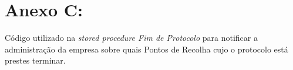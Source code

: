 \chapter{Anexo C: }
\label{anexo:C}
Código utilizado na \textit{stored procedure Fim de Protocolo} para notificar a administração da empresa sobre quais Pontos de Recolha cujo o protocolo está prestes terminar.

\begin{verbatim}

\end{verbatim}

